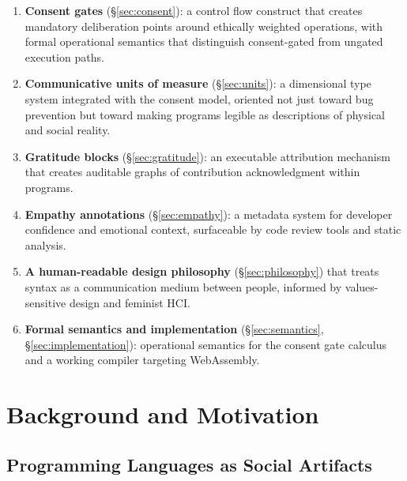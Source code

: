 \documentclass[11pt,a4paper]{article}
\begin{document}
\begin{enumerate}[leftmargin=*]
  \item \textbf{Consent gates} (\S\ref{sec:consent}): a control flow
    construct that creates mandatory deliberation points around
    ethically weighted operations, with formal operational semantics
    that distinguish consent-gated from ungated execution paths.

  \item \textbf{Communicative units of measure}
    (\S\ref{sec:units}): a dimensional type system integrated with the
    consent model, oriented not just toward bug prevention but toward
    making programs legible as descriptions of physical and social
    reality.

  \item \textbf{Gratitude blocks} (\S\ref{sec:gratitude}): an
    executable attribution mechanism that creates auditable graphs of
    contribution acknowledgment within programs.

  \item \textbf{Empathy annotations} (\S\ref{sec:empathy}): a
    metadata system for developer confidence and emotional context,
    surfaceable by code review tools and static analysis.

  \item \textbf{A human-readable design philosophy}
    (\S\ref{sec:philosophy}) that treats syntax as a communication
    medium between people, informed by values-sensitive design and
    feminist HCI.

  \item \textbf{Formal semantics and implementation}
    (\S\ref{sec:semantics}, \S\ref{sec:implementation}): operational
    semantics for the consent gate calculus and a working compiler
    targeting WebAssembly.
\end{enumerate}

\section{Background and Motivation}
\label{sec:background}

\subsection{Programming Languages as Social Artifacts}
\end{document}
